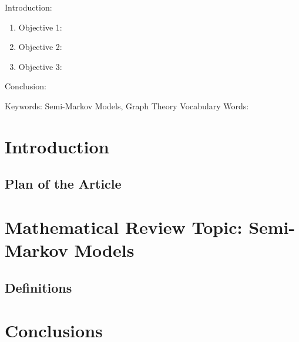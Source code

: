 
\twocolumn
\scriptsize
\begin{frontmatter}
		\title{}
		\author{}
		\address{The Mathematical Learning Space}
\end{frontmatter}	

Introduction:
\begin{enumerate}
\item Objective 1:
\item Objective 2:
\item Objective 3:
\end{enumerate}
Conclusion:

Keywords: Semi-Markov Models, Graph Theory
Vocabulary Words:

\section{Introduction}

\subsection{Plan of the Article}


\section{Mathematical Review Topic: Semi-Markov Models}

\subsection{Definitions}


\section{Conclusions}


